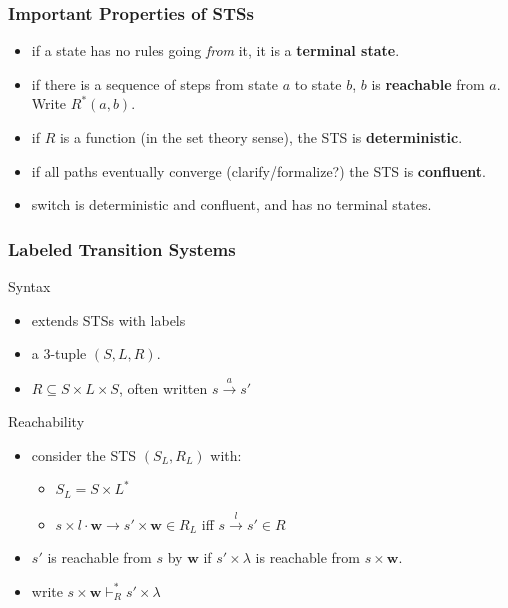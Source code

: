 \documentclass{beamer}
\begin{document}

\begin{frame}
\frametitle{Important Properties of STSs}
\begin{itemize}
\item if a state has no rules going \textit{from} it, it is a \textbf{terminal
    state}.
\item if there is a sequence of steps from state $a$ to state $b$, $b$ is
  \textbf{reachable} from $a$. Write $R^*(a, b)$.
\item if $R$ is a function (in the set theory sense), the STS is \textbf{deterministic}.
\item if all paths eventually converge (clarify/formalize?) the STS is \textbf{confluent}.
\item switch is deterministic and confluent, and has no terminal states.
\end{itemize}
\end{frame}


\begin{frame}
\frametitle{Labeled Transition Systems}
\begin{block}{Syntax}
\begin{itemize}
\item extends STSs with labels
\item a 3-tuple $(S, L, R)$.
\item $R \subseteq S \times L \times S$, often written $s \xrightarrow{a} s'$
\end{itemize}
\end{block}
\begin{block}{Reachability}
\begin{itemize}
\item consider the STS $(S_L, R_L)$ with:
  \begin{itemize}
  \item $S_L = S \times L^*$
  \item $s \times l \cdot \mathbf{w} \rightarrow s' \times \mathbf{w} \in R_L$
    iff $s \xrightarrow{l} s' \in R$ 
   \end{itemize}
\item $s'$ is reachable from $s$ by $\mathbf{w}$ if $s' \times \lambda$ is
      reachable from $s \times \mathbf{w}$.
    \item write $s \times \mathbf{w} \vdash_{R}^* s' \times \lambda$
\end{itemize}
\end{block}
\end{frame}
\end{document}
